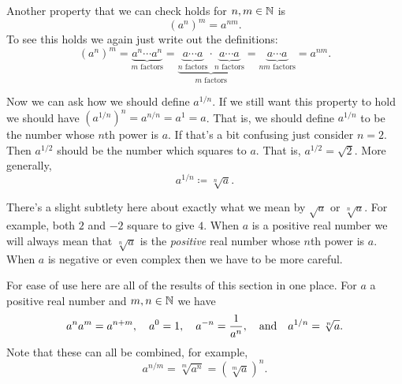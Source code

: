 \documentclass[fleqn]{LectureClass/LectureClass}
\begin{document}
    Another property that we can check holds for \(n, m \in \mathbb{N}\) is
    \begin{equation}
        (a^n)^m = a^{nm}.
    \end{equation}
    To see this holds we again just write out the definitions:
    \begin{equation}
        (a^n)^m = \underbrace{a^n \dotsm a^n}_{m \text{ factors}} = \underbrace{\underbrace{a \dotsm a}_{n \text{ factors}} \cdot \underbrace{a \dotsm a}_{n \text{ factors}}}_{m \text{ factors}} = \underbrace{a \dotsm a}_{nm \text{ factors}} = a^{nm}.
    \end{equation}
    
    Now we can ask how we should define \(a^{1/n}\).
    If we still want this property to hold we should have \((a^{1/n})^n = a^{n/n} = a^1 = a\).
    That is, we should define \(a^{1/n}\) to be the number whose \(n\)th power is \(a\).
    If that's a bit confusing just consider \(n = 2\).
    Then \(a^{1/2}\) should be the number which squares to \(a\).
    That is, \(a^{1/2} = \sqrt{2}\).
    More generally,
    \begin{equation}
        a^{1/n} \coloneq \sqrt[n]{a}.
    \end{equation}
    
    \begin{remark}{}{}
        There's a slight subtlety here about exactly what we mean by \(\sqrt{a}\) or \(\sqrt[n]{a}\).
        For example, both \(2\) and \(-2\) square to give \(4\).
        When \(a\) is a positive real number we will always mean that \(\sqrt[n]{a}\) is the \emph{positive} real number whose \(n\)th power is \(a\).
        When \(a\) is negative or even complex then we have to be more careful.
    \end{remark}
    
    For ease of use here are all of the results of this section in one place.
    For \(a\) a positive real number and \(m, n \in \mathbb{N}\) we have
    \begin{equation}
        a^na^m = a^{n + m}, \quad a^0 = 1, \quad a^{-n} = \frac{1}{a^n}, \quad\text{and}\quad a^{1/n} = \sqrt[n]{a}.
    \end{equation}
    Note that these can all be combined, for example,
    \begin{equation}
        a^{n/m} = \sqrt[m]{a^n} = (\sqrt[m]{a})^n.
    \end{equation}
\end{document}
